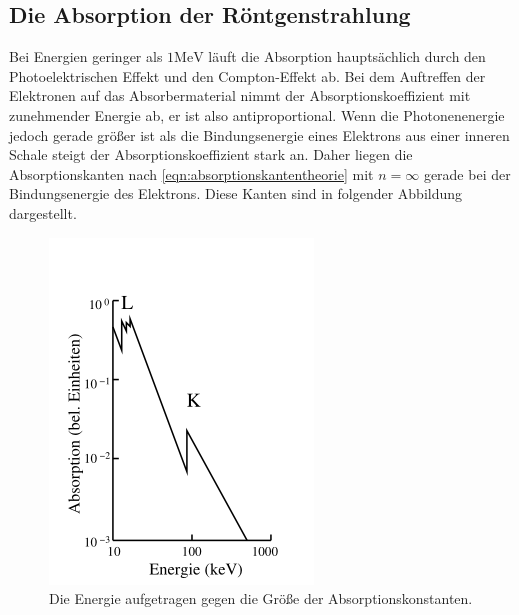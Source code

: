 \subsection{Die Absorption der Röntgenstrahlung}
Bei Energien geringer als $1 \si{\mega\electronvolt}$ läuft die Absorption
hauptsächlich durch den Photoelektrischen Effekt und den Compton-Effekt ab.
Bei dem Auftreffen der Elektronen auf das Absorbermaterial nimmt der
Absorptionskoeffizient mit zunehmender Energie ab, er ist also antiproportional.
Wenn die Photonenenergie jedoch gerade größer ist als die Bindungsenergie eines
Elektrons aus einer inneren Schale steigt der Absorptionskoeffizient stark an.
Daher liegen die Absorptionskanten nach \eqref{eqn:absorptionskantentheorie} mit
$n = \infty$ gerade bei der Bindungsenergie des Elektrons. Diese Kanten sind in
folgender Abbildung dargestellt.
\begin{figure}[H]
  \centering
  \includegraphics[scale=0.5]{"content/absorptionskanten.png"}
  \caption{Die Energie aufgetragen gegen die Größe der Absorptionskonstanten.}
  \label{fig:absorptionskanten}
\end{figure}
\noindent

